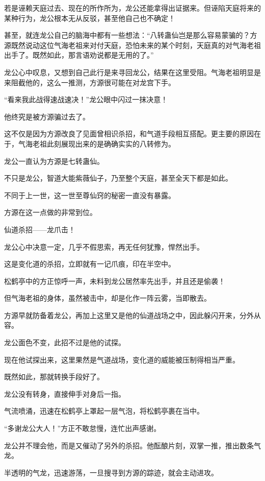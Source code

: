 \begin{this_body}
若是诬赖天庭过去、现在的所作所为，龙公还能拿得出证据来。但诬陷天庭将来的某种行为，龙公根本无从反驳，甚至他自己也不确定！

甚至，就连龙公自己的脑海中都有一些想法：“八转蛊仙岂是那么容易蒙骗的？方源既然说动这位气海老祖来对付天庭，恐怕未来的某个时刻，天庭真的对气海老祖出手了。既然如此，那言语劝说都是无用的了。”

龙公心中叹息，又想到自己此行是来寻回龙公，结果在这里受阻。气海老祖明显是来阻截他的，这么一推测，方源很可能在对龙宫下手。

“看来我此战得速战速决！”龙公眼中闪过一抹决意！

他终究是被方源骗过去了。

这不仅是因为方源改良了见面曾相识杀招，和气道手段相互搭配。更主要的原因在于，气海老祖此刻展现出来的是确确实实的八转修为。

龙公一直认为方源是七转蛊仙。

不只是龙公，智道大能紫薇仙子，乃至整个天庭，甚至全天下都是如此。

不同于上一世，这一世至尊仙窍的秘密一直没有暴露。

方源在这一点做的非常到位。

仙道杀招——龙爪击！

龙公心中决意一定，几乎不假思索，再无任何犹豫，悍然出手。

这是变化道的杀招，立即就有一记爪痕，印在半空中。

松鹤亭中的方正惊呼一声，未料到龙公居然率先出手，并且还是偷袭！

但气海老祖的身体，虽然被击中，却是化作一阵云雾，当即散去。

方源早就防备着龙公，再加上这里又是他的仙道战场之中，因此躲闪开来，分外从容。

龙公面色不变，此招不过是他的试探。

现在他试探出来，这里果然是气道战场，变化道的威能被压制得相当严重。

既然如此，那就转换手段好了。

龙公没有转身，直接伸手对身后一指。

气流喷涌，迅速在松鹤亭上罩起一层气泡，将松鹤亭裹在当中。

“多谢龙公大人！”方正不敢怠慢，连忙出声感谢。

龙公并不理会他，而是又催动了另外的杀招。他酝酿片刻，双掌一推，推出数条气龙。

半透明的气龙，迅速游荡，一旦搜寻到方源的踪迹，就会主动进攻。


\end{this_body}
